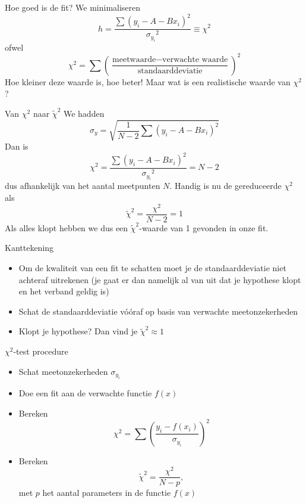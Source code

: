 \documentclass{beamer}
\newcommand{\rchisq}{\tilde\chi^2}
\begin{document}
\begin{frame}{Hoe goed is de fit?}
  We minimaliseren
  \begin{equation*}
    h = \frac{\sum(y_i - A - Bx_i)^2}{{\sigma_{y_i}}^2} \equiv \chi^2
  \end{equation*}
  ofwel
  \begin{equation*}
    \chi^2 = \sum\left(\frac{\text{meetwaarde} - \text{verwachte waarde}}{\text{standaarddeviatie}}\right)^2
  \end{equation*}
  Hoe kleiner deze waarde is, hoe beter! Maar wat is een realistische waarde van $\chi^2$?
\end{frame}

\begin{frame}{Van $\chi^2$ naar $\rchisq$}
  We hadden
  \begin{equation*}
    \sigma_y = \sqrt{\frac{1}{N-2}\sum(y_i - A - Bx_i)^2}
  \end{equation*}
  Dan is
  \begin{equation*}
    \chi^2 = \frac{\sum(y_i - A - Bx_i)^2}{{\sigma_{y_i}}^2} = N - 2
  \end{equation*}
  dus afhankelijk van het aantal meetpunten $N$. Handig is nu de \alert{gereduceerde $\chi^2$} als
  \begin{equation*}
    \rchisq = \frac{\chi^2}{N - 2} = 1
  \end{equation*}
  Als alles klopt hebben we dus een $\rchisq$-waarde van 1 gevonden in onze fit.
\end{frame}

\begin{frame}{Kanttekening}
  \begin{itemize}
    \item Om de kwaliteit van een fit te schatten moet je de standaarddeviatie niet achteraf uitrekenen (je gaat er dan namelijk al van uit dat je hypothese klopt en het verband geldig is)
    \pause
    \item Schat de standaarddeviatie vóóraf op basis van verwachte meetonzekerheden
    \pause
    \item Klopt je hypothese? Dan vind je $\rchisq \approx 1$
  \end{itemize}
\end{frame}

\begin{frame}{$\chi^2$-test procedure}
  \begin{itemize}
    \item Schat meetonzekerheden $\sigma_{y_i}$
    \item Doe een fit aan de verwachte functie $f(x)$
    \item Bereken
    \begin{equation*}
      \chi^2 = \sum\left(\frac{y_i - f(x_i)}{\sigma_{y_i}}\right)^2
    \end{equation*}
    \item Bereken
    \begin{equation*}
      \rchisq = \frac{\chi^2}{N - p},
    \end{equation*}
    met $p$ het aantal parameters in de functie $f(x)$
  \end{itemize}
\end{frame}
\end{document}
